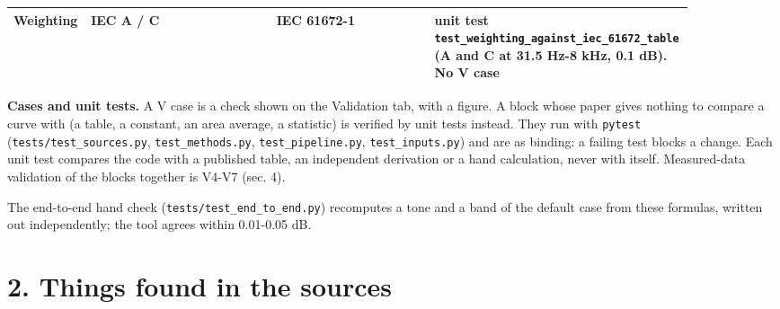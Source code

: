 \documentclass[10pt,a4paper]{article}
\begin{document}
{\begin{longtable}{>{\raggedright\arraybackslash}p{0.095\linewidth}>{\raggedright\arraybackslash}p{0.276\linewidth}>{\raggedright\arraybackslash}p{0.233\linewidth}>{\raggedright\arraybackslash}p{0.276\linewidth}}
Weighting & IEC A / C & IEC 61672-1 & unit test \texttt{test\_\allowbreak{}weighting\_\allowbreak{}against\_\allowbreak{}iec\_\allowbreak{}61672\_\allowbreak{}table} (A and C at 31.5 Hz-8 kHz, 0.1 dB). No V case \\
\hline
\end{longtable}}

\textbf{Cases and unit tests.} A V case is a check shown on the Validation tab, with a figure. A block whose paper gives nothing to compare a curve with (a table, a constant, an area average, a statistic) is verified by unit tests instead. They run with \texttt{pytest} (\texttt{tests/\allowbreak{}test\_\allowbreak{}sources.\allowbreak{}py}, \texttt{test\_\allowbreak{}methods.\allowbreak{}py}, \texttt{test\_\allowbreak{}pipeline.\allowbreak{}py}, \texttt{test\_\allowbreak{}inputs.\allowbreak{}py}) and are as binding: a failing test blocks a change. Each unit test compares the code with a published table, an independent derivation or a hand calculation, never with itself. Measured-data validation of the blocks together is V4-V7 (sec. 4).

The end-to-end hand check (\texttt{tests/\allowbreak{}test\_\allowbreak{}end\_\allowbreak{}to\_\allowbreak{}end.\allowbreak{}py}) recomputes a tone and a band of the default case from these formulas, written out independently; the tool agrees within 0.01-0.05 dB.

\section*{2. Things found in the sources}
\end{document}
